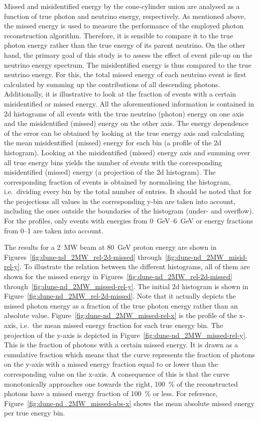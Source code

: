Missed and misidentified energy by the cone-cylinder union are analysed as a function of true photon and neutrino energy, respectively.
As mentioned above, the missed energy is used to measure the performance of the employed photon reconstruction algorithm.
Therefore, it is sensible to compare it to the true photon energy rather than the true energy of its parent neutrino.
On the other hand, the primary goal of this study is to assess the effect of event pile-up on the neutrino energy spectrum.
The misidentified energy is thus compared to the true neutrino energy.
For this, the total missed energy of each neutrino event is first calculated by summing up the contributions of all descending \Pgpz photons.
Additionally, it is illustrative to look at the fraction of events with a certain misidentified or missed energy.
All the aforementioned information is contained in \gls{2d} histograms of all events with the true neutrino (photon) energy on one axis and the misidentified (missed) energy on the other axis.
The energy dependence of the error can be obtained by looking at the true energy axis and calculating the mean misidentified (missed) energy for each bin (a profile of the \gls{2d} histogram).
Looking at the misidentified (missed) energy axis and summing over all true energy bins yields the number of events with the corresponding misidentified (missed) energy (a projection of the \gls{2d} histogram).
The corresponding fraction of events is obtained by normalising the histogram, i.e.\ dividing every bin by the total number of entries.
It should be noted that for the projections all values in the corresponding y-bin are taken into account, including the ones outside the boundaries of the histogram (under- and overflow).
For the profiles, only events with energies from \SIrange{0}{6}{\giga\electronvolt} or energy fractions from \numrange{0}{1} are taken into account.

The results for a \SI{2}{\mega\watt} beam at \SI{80}{\giga\electronvolt} proton energy are shown in Figures~\ref{fig:dune-nd_2MW_rel-2d-missed} through~\ref{fig:dune-nd_2MW_misid-rel-y}.
To illustrate the relation between the different histograms, all of them are shown for the missed energy in Figures~\ref{fig:dune-nd_2MW_rel-2d-missed} through~\ref{fig:dune-nd_2MW_missed-rel-y}.
The initial \gls{2d} histogram is shown in Figure~\ref{fig:dune-nd_2MW_rel-2d-missed}.
Note that it actually depicts the missed photon energy as a fraction of the true photon energy rather than an absolute value.
Figure~\ref{fig:dune-nd_2MW_missed-rel-x} is the profile of the x-axis, i.e.\ the mean missed energy fraction for each true energy bin.
The projection of the y-axis is depicted in Figure~\ref{fig:dune-nd_2MW_missed-rel-y}.
This is the fraction of photons with a certain missed energy.
It is drawn as a cumulative fraction which means that the curve represents the fraction of photons on the y-axis with a missed energy fraction equal to or lower than the corresponding value on the x-axis.
A consequence of this is that the curve monotonically approaches one towards the right, \SI{100}{\percent} of the reconstructed photons have a missed energy fraction of \SI{100}{\percent} or less.
For reference, Figure~\ref{fig:dune-nd_2MW_missed-abs-x} shows the mean absolute missed energy per true energy bin.

